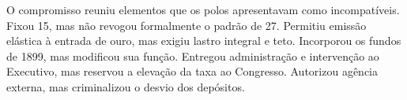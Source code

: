 O compromisso reuniu elementos que os polos apresentavam como incompatíveis. Fixou 15, mas não revogou formalmente o padrão de 27. Permitiu emissão elástica à entrada de ouro, mas exigiu lastro integral e teto. Incorporou os fundos de 1899, mas modificou sua função. Entregou administração e intervenção ao Executivo, mas reservou a elevação da taxa ao Congresso. Autorizou agência externa, mas criminalizou o desvio dos depósitos.

